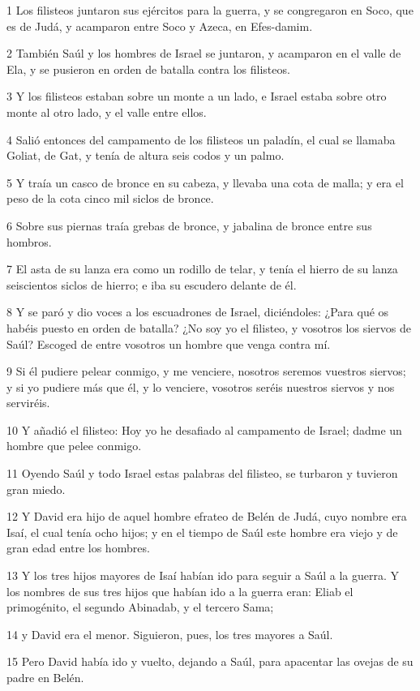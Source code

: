 \par 1 Los filisteos juntaron sus ejércitos para la guerra, y se congregaron en Soco, que es de Judá, y acamparon entre Soco y Azeca, en Efes-damim.
\par 2 También Saúl y los hombres de Israel se juntaron, y acamparon en el valle de Ela, y se pusieron en orden de batalla contra los filisteos.
\par 3 Y los filisteos estaban sobre un monte a un lado, e Israel estaba sobre otro monte al otro lado, y el valle entre ellos.
\par 4 Salió entonces del campamento de los filisteos un paladín, el cual se llamaba Goliat, de Gat, y tenía de altura seis codos   y un palmo.
\par 5 Y traía un casco de bronce en su cabeza, y llevaba una cota de malla; y era el peso de la cota cinco mil siclos   de bronce.
\par 6 Sobre sus piernas traía grebas de bronce, y jabalina de bronce entre sus hombros.
\par 7 El asta de su lanza era como un rodillo de telar, y tenía el hierro de su lanza seiscientos siclos   de hierro; e iba su escudero delante de él.
\par 8 Y se paró y dio voces a los escuadrones de Israel, diciéndoles: ¿Para qué os habéis puesto en orden de batalla? ¿No soy yo el filisteo, y vosotros los siervos de Saúl? Escoged de entre vosotros un hombre que venga contra mí.
\par 9 Si él pudiere pelear conmigo, y me venciere, nosotros seremos vuestros siervos; y si yo pudiere más que él, y lo venciere, vosotros seréis nuestros siervos y nos serviréis.
\par 10 Y añadió el filisteo: Hoy yo he desafiado al campamento de Israel; dadme un hombre que pelee conmigo.
\par 11 Oyendo Saúl y todo Israel estas palabras del filisteo, se turbaron y tuvieron gran miedo.
\par 12 Y David era hijo de aquel hombre efrateo de Belén de Judá, cuyo nombre era Isaí, el cual tenía ocho hijos; y en el tiempo de Saúl este hombre era viejo y de gran edad entre los hombres.
\par 13 Y los tres hijos mayores de Isaí habían ido para seguir a Saúl a la guerra. Y los nombres de sus tres hijos que habían ido a la guerra eran: Eliab el primogénito, el segundo Abinadab, y el tercero Sama;
\par 14 y David era el menor. Siguieron, pues, los tres mayores a Saúl.
\par 15 Pero David había ido y vuelto, dejando a Saúl, para apacentar las ovejas de su padre en Belén.
